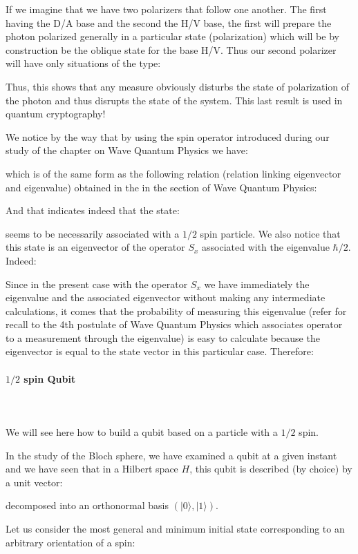 	If we imagine that we have two polarizers that follow one another. The first having the D/A base and the second the H/V base, the first will prepare the photon polarized generally in a particular state (polarization) which will be by construction be the oblique state for the base H/V. Thus our second polarizer will have only situations of the type:
	
	Thus, this shows that any measure obviously disturbs the state of polarization of the photon and thus disrupts the state of the system. This last result is used in quantum cryptography!

	We notice by the way that by using the spin operator introduced during our study of the chapter on Wave Quantum Physics we have:
	
	which is of the same form as the following relation (relation linking eigenvector and eigenvalue) obtained in the in the section of Wave Quantum Physics:
	
	And that indicates indeed that the state:
	
	seems to be necessarily associated with a $1/2$ spin particle. We also notice that this state is an eigenvector of the operator $S_x$ associated with the eigenvalue $\hbar/2$. Indeed:
	
	Since in the present case with the operator $S_x$ we have immediately the eigenvalue and the associated eigenvector without making any intermediate calculations, it comes that the probability of measuring this eigenvalue (refer for recall to the 4th postulate of Wave Quantum Physics which associates operator to a measurement through the eigenvalue) is easy to calculate because the eigenvector is equal to the state vector in this particular case. Therefore:
	
	
	\paragraph{$1/2$ spin Qubit}\mbox{}\\\\
	We will see here how to build a qubit based on a particle with a $1/2$ spin.

	In the study of the Bloch sphere, we have examined a qubit at a given instant and we have seen that in a Hilbert space $H$, this qubit is described (by choice) by a unit vector:
	
	decomposed into an orthonormal basis $(|0\rangle, |1\rangle)$.

	Let us consider the most general and minimum initial state corresponding to an arbitrary orientation of a spin:
	
